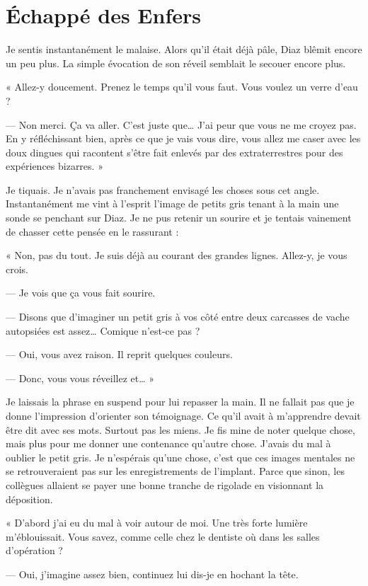 \chapter{Échappé des Enfers}

Je sentis instantanément le malaise. Alors qu'il était déjà pâle, Diaz blêmit encore un peu plus.
La simple évocation de son réveil semblait le secouer encore plus.

« Allez-y doucement. Prenez le temps qu'il vous faut. Vous voulez un verre d'eau ?

— Non merci. Ça va aller. C'est juste que… J'ai peur que vous ne me croyez pas. En y réfléchissant bien, après ce que
je vais vous dire, vous allez me caser avec les doux dingues qui racontent s'être fait enlevés par des extraterrestres
pour des expériences bizarres. »

Je tiquais. Je n'avais pas franchement envisagé les choses sous cet angle. Instantanément me vint à l'esprit l'image de
petits gris tenant à la main une sonde se penchant sur Diaz. Je ne pus retenir un sourire et je tentais vainement de
chasser cette pensée en le rassurant :

« Non, pas du tout. Je suis déjà au courant des grandes lignes. Allez-y, je vous crois.

— Je vois que ça vous fait sourire.

— Disons que d'imaginer un petit gris à vos côté entre deux carcasses de vache autopsiées est assez… Comique n'est-ce
pas ?

— Oui, vous avez raison. Il reprit quelques couleurs.

— Donc, vous vous réveillez et… »

Je laissais la phrase en suspend pour lui repasser la main. Il ne fallait pas que je donne l'impression d'orienter son
témoignage. Ce qu'il avait à m'apprendre devait être dit avec ses mots. Surtout pas les miens. Je fis mine de noter
quelque chose, mais plus pour me donner une contenance qu'autre chose. J'avais du mal à oublier le petit gris. Je
n'espérais qu'une chose, c'est que ces images mentales ne se retrouveraient pas sur les enregistrements de l'implant.
Parce que sinon, les collègues allaient se payer une bonne tranche de rigolade en visionnant la déposition.

« D'abord j'ai eu du mal à voir autour de moi. Une très forte lumière m'éblouissait. Vous savez, comme celle chez le
dentiste où dans les salles d'opération ?

— Oui, j'imagine assez bien, continuez lui dis-je en hochant la tête.

